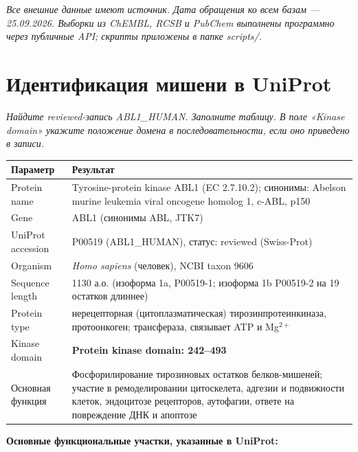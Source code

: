 \documentclass[11pt,a4paper]{article}
\newcommand{\code}[1]{{\ttfamily #1}}
\newcommand{\instr}[1]{{\small\itshape #1\par}}
\begin{document}
\instr{Все внешние данные имеют источник. Дата обращения ко всем базам --- 25.09.2026.
Выборки из ChEMBL, RCSB и PubChem выполнены программно через публичные API; скрипты
приложены в папке \code{scripts/}.}

\section{Идентификация мишени в UniProt}
\instr{Найдите reviewed-запись ABL1\_HUMAN. Заполните таблицу. В поле «Kinase domain»
укажите положение домена в последовательности, если оно приведено в записи.}

\begin{center}
\begin{tabular}{|L{4cm}|L{11.5cm}|}
\hline
\textbf{Параметр} & \textbf{Результат} \\
\hline
Protein name & Tyrosine-protein kinase ABL1 (EC 2.7.10.2); синонимы: Abelson murine
leukemia viral oncogene homolog 1, c-ABL, p150 \\
\hline
Gene & \code{ABL1} (синонимы \code{ABL}, \code{JTK7}) \\
\hline
UniProt accession & \code{P00519} (\code{ABL1\_HUMAN}), статус: reviewed (Swiss-Prot) \\
\hline
Organism & \emph{Homo sapiens} (человек), NCBI taxon 9606 \\
\hline
Sequence length & 1130 а.о. (изоформа 1a, \code{P00519-1}; изоформа 1b
\code{P00519-2} на 19 остатков длиннее) \\
\hline
Protein type & нерецепторная (цитоплазматическая) тирозинпротеинкиназа, протоонкоген;
трансфераза, связывает ATP и Mg$^{2+}$ \\
\hline
Kinase domain & \textbf{Protein kinase domain: 242--493} \\
\hline
Основная функция & Фосфорилирование тирозиновых остатков белков-мишеней; участие в
ремоделировании цитоскелета, адгезии и подвижности клеток, эндоцитозе рецепторов,
аутофагии, ответе на повреждение ДНК и апоптозе \\
\hline
\end{tabular}
\end{center}

\textbf{Основные функциональные участки, указанные в UniProt:}
\end{document}

